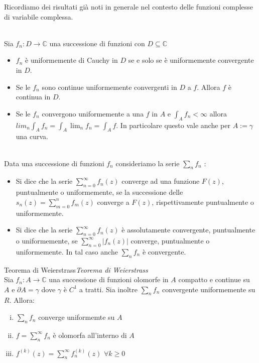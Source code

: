 \documentclass[11pt,a4paper,twoside]{book}
\newenvironment{teorema}[1][\empty]{\begin{Teorema}{
\ifx\empty#1\relax\else\mdseries\itshape#1\\\fi
}{}}{\end{Teorema}}
\newenvironment{definizione}[1][\empty]{\begin{Definizione}{
\ifx\empty#1\relax\else\mdseries\itshape#1\\\fi
}{}}{\end{Definizione}}
\theoremstyle{esss}
\theoremstyle{dotless}
\numberwithin{equation}{section} %
\begin{document}
Ricordiamo dei risultati già noti in generale nel contesto delle funzioni complesse di variabile complessa.

\begin{teorema} Sia $f_n:D\rightarrow\mathbb{C}$ una successione di funzioni con $D\subseteq\mathbb{C}$\begin{itemize}[label=$\cdot$]
\item  $f_n$ è uniformemente di Cauchy in $D$ se e solo se è uniformemente convergente in $D$.
\item Se le $f_n$ sono continue uniformemente convergenti in $D$ a $f$. Allora $f$ è continua in $D$.
\item Se le $f_n$ convergono uniformemente a una $f$ in $A$ e $\int_A f_n<\infty$ allora $lim_n \int_A f_n = \int_A \lim_n f_n =\int_A f$. In particolare questo vale anche per $A:=\gamma$ una curva.
\end{itemize}
\end{teorema}

\begin{definizione}Data una successione di funzioni $f_n$ consideriamo la serie $\sum_{n}f_n$ :
\begin{itemize}[i.]
\item Si dice che la serie $\sum_{n=0}^\infty f_n(z)$ converge ad una funzione $F(z)$, puntualmente o uniformemente, se la successione delle $s_n(z)=\sum_{m=0}^n f_m(z)$ converge a $F(z)$, rispettivamente puntualmente o uniformemente.
\item Si dice che la serie $\sum_{n=0}^\infty f_n(z)$ è assolutamente convergente, puntualmente o uniformemente, se $\sum_{n=0}^\infty |f_n(z)|$ converge, puntualmente o uniformemente. In tal caso anche $\sum_n f_n$ è convergente.
\end{itemize}
\end{definizione}

\begin{teorema}[Teorema di Weierstrass]
Sia $f_n:A\rightarrow\mathbb{C}$ una successione di funzioni olomorfe in $A$ compatto e continue su $A$ e $\partial A=\gamma$ dove $\gamma$ è $C^1$ a tratti. Sia inoltre $\sum_n f_n$ convergente uniformemente su $R$. Allora:\begin{enumerate}[i.]
\item $\sum_n f_n$ converge uniformemte su $A$
\item $f=\sum_n^\infty f_n$ è olomorfa all'interno di $A$
\item $f^{(k)}(z)=\sum_n^\infty f_n^{(k)} (z)$ $\forall k\geq 0$
\end{enumerate}
\end{teorema}
\end{document}
